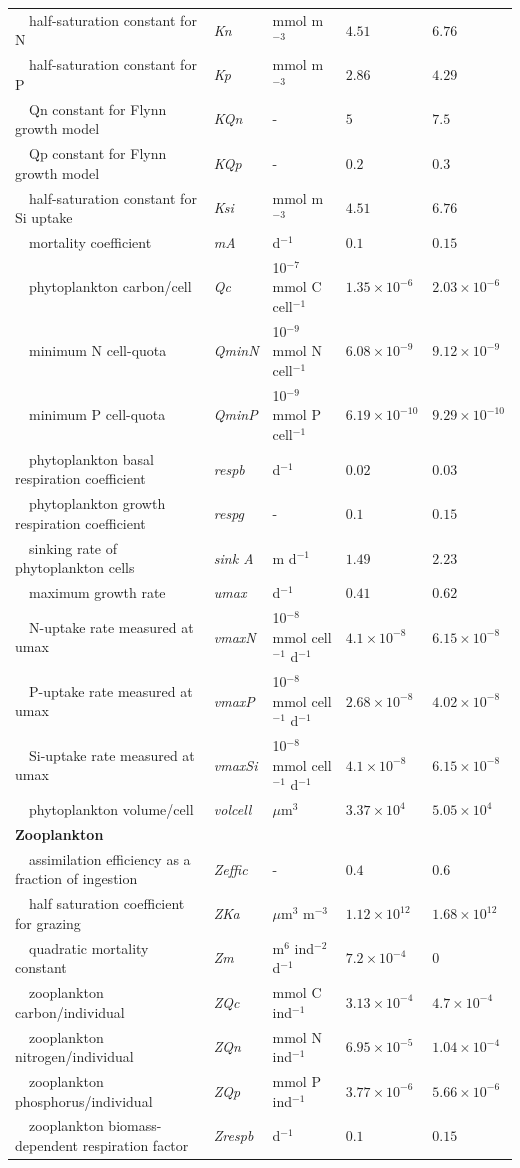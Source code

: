 \documentclass[review]{elsarticle}\usepackage[]{graphicx}\usepackage[]{color}
\begin{document}
\begin{table}[!tbp]
{\begin{center}
\begin{tabular}{lllll}
~~half-saturation constant for N&\textit{Kn}&mmol m$^{-3}$&$4.51$&$6.76$\tabularnewline
~~half-saturation constant for P&\textit{Kp}&mmol m$^{-3}$&$2.86$&$4.29$\tabularnewline
~~Qn constant for Flynn growth model&\textit{KQn}&-&$5$&$7.5$\tabularnewline
~~Qp constant for Flynn growth model&\textit{KQp}&-&$0.2$&$0.3$\tabularnewline
~~half-saturation constant for Si uptake&\textit{Ksi}&mmol m$^{-3}$&$4.51$&$6.76$\tabularnewline
~~mortality coefficient&\textit{mA}&d$^{-1}$&$0.1$&$0.15$\tabularnewline
~~phytoplankton carbon/cell&\textit{Qc}&10$^{-7}$ mmol C cell$^{-1}$&$1.35\times 10^{-6}$&$2.03\times 10^{-6}$\tabularnewline
~~minimum N cell-quota&\textit{QminN}&10$^{-9}$ mmol N cell$^{-1}$&$6.08\times 10^{-9}$&$9.12\times 10^{-9}$\tabularnewline
~~minimum P cell-quota&\textit{QminP}&10$^{-9}$ mmol P cell$^{-1}$&$6.19\times 10^{-10}$&$9.29\times 10^{-10}$\tabularnewline
~~phytoplankton basal respiration coefficient&\textit{respb}&d$^{-1}$&$0.02$&$0.03$\tabularnewline
~~phytoplankton growth respiration coefficient&\textit{respg}&-&$0.1$&$0.15$\tabularnewline
~~sinking rate of phytoplankton cells&\textit{sink A}&m d$^{-1}$&$1.49$&$2.23$\tabularnewline
~~maximum growth rate&\textit{umax}&d$^{-1}$&$0.41$&$0.62$\tabularnewline
~~N-uptake rate measured at umax&\textit{vmaxN}&10$^{-8}$ mmol cell$^{-1}$ d$^{-1}$&$4.1\times 10^{-8}$&$6.15\times 10^{-8}$\tabularnewline
~~P-uptake rate measured at umax&\textit{vmaxP}&10$^{-8}$ mmol cell$^{-1}$ d$^{-1}$&$2.68\times 10^{-8}$&$4.02\times 10^{-8}$\tabularnewline
~~Si-uptake rate measured at umax&\textit{vmaxSi}&10$^{-8}$ mmol cell$^{-1}$ d$^{-1}$&$4.1\times 10^{-8}$&$6.15\times 10^{-8}$\tabularnewline
~~phytoplankton volume/cell&\textit{volcell}&$\mu$m$^3$&$3.37\times 10^{4}$&$5.05\times 10^{4}$\tabularnewline
\hline
{\bfseries Zooplankton}&&&&\tabularnewline
~~assimilation efficiency as a fraction of ingestion&\textit{Zeffic}&-&$0.4$&$0.6$\tabularnewline
~~half saturation coefficient for grazing&\textit{ZKa}&$\mu$m$^3$ m$^{-3}$&$1.12\times 10^{12}$&$1.68\times 10^{12}$\tabularnewline
~~quadratic mortality constant&\textit{Zm}&m$^6$ ind$^{-2}$ d$^{-1}$&$7.2\times 10^{-4}$&$0$\tabularnewline
~~zooplankton carbon/individual&\textit{ZQc}&mmol C ind$^{-1}$&$3.13\times 10^{-4}$&$4.7\times 10^{-4}$\tabularnewline
~~zooplankton nitrogen/individual&\textit{ZQn}&mmol N ind$^{-1}$&$6.95\times 10^{-5}$&$1.04\times 10^{-4}$\tabularnewline
~~zooplankton phosphorus/individual&\textit{ZQp}&mmol P ind$^{-1}$&$3.77\times 10^{-6}$&$5.66\times 10^{-6}$\tabularnewline
~~zooplankton biomass-dependent respiration factor&\textit{Zrespb}&d$^{-1}$&$0.1$&$0.15$\tabularnewline

\end{tabular}
\end{center}}
\end{table}
\end{document}
